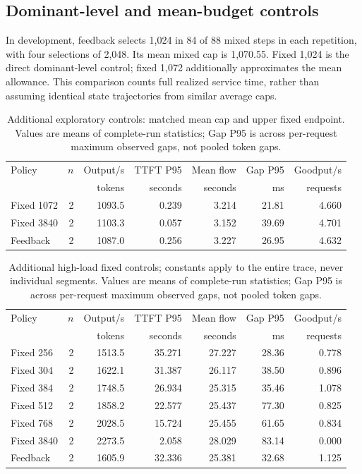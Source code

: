 \subsection{Dominant-level and mean-budget controls}

In development, feedback selects 1,024 in 84 of 88 mixed steps in each repetition, with four selections of 2,048. Its mean mixed cap is 1,070.55. Fixed 1,024 is the direct dominant-level control; fixed 1,072 additionally approximates the mean allowance. This comparison counts full realized service time, rather than assuming identical state trajectories from similar average caps.

\begin{table}[H]\centering\small
\begin{tabular}{lrrrrrr}
\toprule
Policy & $n$ & Output/s & TTFT P95 & Mean flow & Gap P95 & Goodput/s \\
 & & tokens & seconds & seconds & ms & requests \\ \midrule
Fixed 1072 & 2 & 1093.5 & 0.239 & 3.214 & 21.81 & 4.660 \\
Fixed 3840 & 2 & 1103.3 & 0.057 & 3.152 & 39.69 & 4.701 \\
Feedback & 2 & 1087.0 & 0.256 & 3.227 & 26.95 & 4.632 \\
\bottomrule\end{tabular}
\caption{Additional exploratory controls: matched mean cap and upper fixed endpoint. Values are means of complete-run statistics; Gap P95 is across per-request maximum observed gaps, not pooled token gaps.}
\end{table}

\begin{table}[H]\centering\small
\begin{tabular}{lrrrrrr}
\toprule
Policy & $n$ & Output/s & TTFT P95 & Mean flow & Gap P95 & Goodput/s \\
 & & tokens & seconds & seconds & ms & requests \\ \midrule
Fixed 256 & 2 & 1513.5 & 35.271 & 27.227 & 28.36 & 0.778 \\
Fixed 304 & 2 & 1622.1 & 31.387 & 26.117 & 38.50 & 0.896 \\
Fixed 384 & 2 & 1748.5 & 26.934 & 25.315 & 35.46 & 1.078 \\
Fixed 512 & 2 & 1858.2 & 22.577 & 25.437 & 77.30 & 0.825 \\
Fixed 768 & 2 & 2028.5 & 15.724 & 25.455 & 61.65 & 0.834 \\
Fixed 3840 & 2 & 2273.5 & 2.058 & 28.029 & 83.14 & 0.000 \\
Feedback & 2 & 1605.9 & 32.336 & 25.381 & 32.68 & 1.125 \\
\bottomrule\end{tabular}
\caption{Additional high-load fixed controls; constants apply to the entire trace, never individual segments. Values are means of complete-run statistics; Gap P95 is across per-request maximum observed gaps, not pooled token gaps.}
\end{table}


